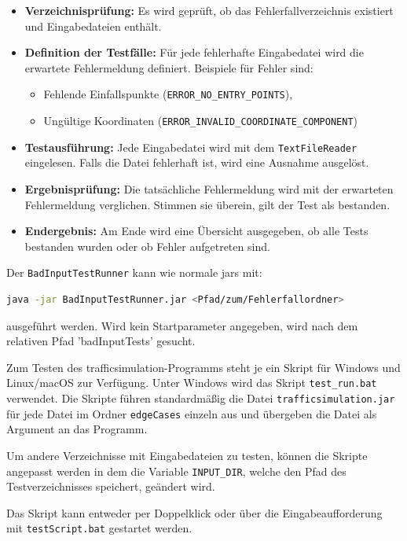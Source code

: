 \begin{itemize}
    \item \textbf{Verzeichnisprüfung:} Es wird geprüft, ob das Fehlerfallverzeichnis existiert und Eingabedateien enthält.
    \item \textbf{Definition der Testfälle:} Für jede fehlerhafte Eingabedatei wird die erwartete Fehlermeldung definiert. Beispiele für Fehler sind:
    \begin{itemize}
        \item Fehlende Einfallspunkte (\texttt{ERROR\_NO\_ENTRY\_POINTS}),
        \item Ungültige Koordinaten (\texttt{ERROR\_INVALID\_COORDINATE\_COMPONENT})
    \end{itemize}
    \item \textbf{Testausführung:} Jede Eingabedatei wird mit dem \texttt{TextFileReader} eingelesen. Falls die Datei fehlerhaft ist, wird eine Ausnahme ausgelöst.
    \item \textbf{Ergebnisprüfung:} Die tatsächliche Fehlermeldung wird mit der erwarteten Fehlermeldung verglichen. Stimmen sie überein, gilt der Test als bestanden.
    \item \textbf{Endergebnis:} Am Ende wird eine Übersicht ausgegeben, ob alle Tests bestanden wurden oder ob Fehler aufgetreten sind.
\end{itemize}

Der \texttt{BadInputTestRunner} kann wie normale jars mit:
    \begin{lstlisting}[language=bash]
java -jar BadInputTestRunner.jar <Pfad/zum/Fehlerfallordner>
    \end{lstlisting}
ausgeführt werden.
Wird kein Startparameter angegeben, wird nach dem relativen Pfad 'badInputTests' gesucht.


Zum Testen des trafficsimulation-Programms steht je ein Skript für Windows und Linux/macOS zur Verfügung. Unter Windows wird das Skript \texttt{test\_run.bat} verwendet.
Die Skripte führen standardmäßig die Datei \texttt{trafficsimulation.jar} für jede Datei im Ordner \texttt{edgeCases} einzeln aus und übergeben die Datei als Argument an das Programm.

Um andere Verzeichnisse mit Eingabedateien zu testen, können die Skripte angepasst werden in dem die Variable \texttt{INPUT\_DIR},
welche den Pfad des Testverzeichnisses speichert, geändert wird.

Das Skript kann entweder per Doppelklick oder über die Eingabeaufforderung mit \texttt{testScript.bat} gestartet werden.

